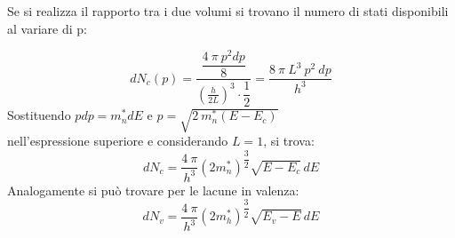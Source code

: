 %
Se si realizza il rapporto tra i due volumi si trovano il numero di stati disponibili al variare di p:\\
%
\noindent\begin{minipage}{0.5\textwidth}
\begin{equation}
    dN_c(p)=\dfrac{\dfrac{4\ \pi\ p^2 dp}{8}}{\left( \frac{h}{2L}\right)^3 \cdot \dfrac{1}{2}} = \dfrac{8\ \pi\ L^3\ p^2\ dp}{h^3}
\end{equation}
%
Sostituendo $pdp=m_n^*dE$ e $p=\sqrt{2\ m_n^*(E-E_c)}$ \\nell'espressione superiore e considerando $L=1$, si trova:
%
\begin{equation}
    dN_c=\dfrac{4\ \pi
    }{h^3}(2m_n^*)^{\dfrac{3}{2}}\sqrt{E-E_c} \,dE
\end{equation}
%
Analogamente si può trovare per le lacune in valenza:
%
\begin{equation}
    dN_v=\dfrac{4\ \pi
    }{h^3}(2m_h^*)^{\dfrac{3}{2}}\sqrt{E_v-E} \,dE
\end{equation}
%
\end{minipage}
\hfill%
\begin{minipage}{0.4\textwidth}\raggedleft
    \begin{center}
  \end{center}
\end{minipage}
